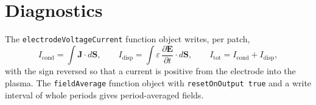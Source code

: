\documentclass[11pt,a4paper]{article}
\newcommand{\kw}[1]{\texttt{#1}}
\newcommand{\bE}{\mathbf{E}}
\newcommand{\pd}[2]{\frac{\partial #1}{\partial #2}}
\begin{document}
\section{Diagnostics}

The \kw{electrodeVoltageCurrent} function object writes, per patch,
\begin{equation}
I_\mathrm{cond}=\int \mathbf{J}\cdot d\mathbf{S},\qquad
I_\mathrm{disp}=\int \varepsilon\,\pd{\bE}{t}\cdot d\mathbf{S},\qquad
I_\mathrm{tot}=I_\mathrm{cond}+I_\mathrm{disp},
\end{equation}
with the sign reversed so that a current is positive from the electrode into
the plasma. The \kw{fieldAverage} function object with
\kw{resetOnOutput true} and a write interval of whole periods gives
period-averaged fields.
\end{document}
